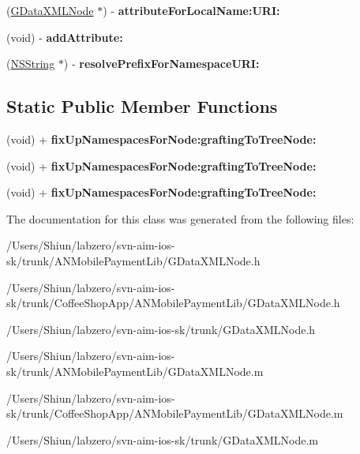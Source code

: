 \begin{DoxyCompactItemize}
\item 
\hypertarget{interface_g_data_x_m_l_element_aa685fc8bb2453aa2af8543eaa3ac27bc}{
(\hyperlink{interface_g_data_x_m_l_node}{GDataXMLNode} $\ast$) -\/ {\bfseries attributeForLocalName:URI:}}
\label{interface_g_data_x_m_l_element_aa685fc8bb2453aa2af8543eaa3ac27bc}

\item 
\hypertarget{interface_g_data_x_m_l_element_a51a2307fd7086c0e814fd7b3d5da86bf}{
(void) -\/ {\bfseries addAttribute:}}
\label{interface_g_data_x_m_l_element_a51a2307fd7086c0e814fd7b3d5da86bf}

\item 
\hypertarget{interface_g_data_x_m_l_element_ab27be508b932cbe3d0686659069e41b7}{
(\hyperlink{class_n_s_string}{NSString} $\ast$) -\/ {\bfseries resolvePrefixForNamespaceURI:}}
\label{interface_g_data_x_m_l_element_ab27be508b932cbe3d0686659069e41b7}

\end{DoxyCompactItemize}
\subsection*{Static Public Member Functions}
\begin{DoxyCompactItemize}
\item 
\hypertarget{interface_g_data_x_m_l_element_a5f56aa547c9ba1abdc3d68e050a9b4e3}{
(void) + {\bfseries fixUpNamespacesForNode:graftingToTreeNode:}}
\label{interface_g_data_x_m_l_element_a5f56aa547c9ba1abdc3d68e050a9b4e3}

\item 
\hypertarget{interface_g_data_x_m_l_element_a5f56aa547c9ba1abdc3d68e050a9b4e3}{
(void) + {\bfseries fixUpNamespacesForNode:graftingToTreeNode:}}
\label{interface_g_data_x_m_l_element_a5f56aa547c9ba1abdc3d68e050a9b4e3}

\item 
\hypertarget{interface_g_data_x_m_l_element_a5f56aa547c9ba1abdc3d68e050a9b4e3}{
(void) + {\bfseries fixUpNamespacesForNode:graftingToTreeNode:}}
\label{interface_g_data_x_m_l_element_a5f56aa547c9ba1abdc3d68e050a9b4e3}

\end{DoxyCompactItemize}


The documentation for this class was generated from the following files:\begin{DoxyCompactItemize}
\item 
/Users/Shiun/labzero/svn-\/aim-\/ios-\/sk/trunk/ANMobilePaymentLib/GDataXMLNode.h\item 
/Users/Shiun/labzero/svn-\/aim-\/ios-\/sk/trunk/CoffeeShopApp/ANMobilePaymentLib/GDataXMLNode.h\item 
/Users/Shiun/labzero/svn-\/aim-\/ios-\/sk/trunk/GDataXMLNode.h\item 
/Users/Shiun/labzero/svn-\/aim-\/ios-\/sk/trunk/ANMobilePaymentLib/GDataXMLNode.m\item 
/Users/Shiun/labzero/svn-\/aim-\/ios-\/sk/trunk/CoffeeShopApp/ANMobilePaymentLib/GDataXMLNode.m\item 
/Users/Shiun/labzero/svn-\/aim-\/ios-\/sk/trunk/GDataXMLNode.m\end{DoxyCompactItemize}
